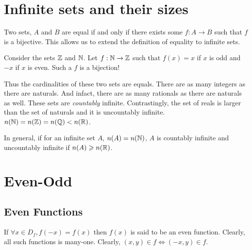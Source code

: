 \section{Infinite sets and their sizes}

\irrev

Two sets, \(A\) and \(B\) are equal if and only if there exists 
some \(f : A \to B\) such that \(f\) is a bijective. This allows us to extend the definition
of equality to infinite sets.

Consider the sets \(\mathbb Z\) and \(\mathbb N\). Let \(f : \mathbb N \to \mathbb Z\) such that 
\(f(x) = x\) if \(x\) is odd and \(-x\) if \(x\) is even. Such a \(f\) is a bijection!

Thus the cardinalities of these two sets are equals. There are as many integers as there are
naturals. And infact, there are as many rationals as there are naturals as well.  
These sets are \emph{countably} infinite. Contrastingly, the set of reals is larger
than the set of naturals and it is uncountably infinite. \(n(\mathbb N) = n(\mathbb Z) = n(\mathbb Q) < n(\mathbb R)\).

In general, if for an infinite set \(A\), \(n(A) = n(\mathbb N)\), \(A\) is countably infinite
and uncountably infinite if \(n(A) \geqslant n(\mathbb R)\). 

\section{Even-Odd}

\subsection{Even Functions}

If \(\forall x \in D_f, f(-x) = f(x)\) then \(f(x)\) is said to be an even function. 
Clearly, all such functions is many-one. Clearly, \((x,y) \in f \iff (-x,y) \in f\).


